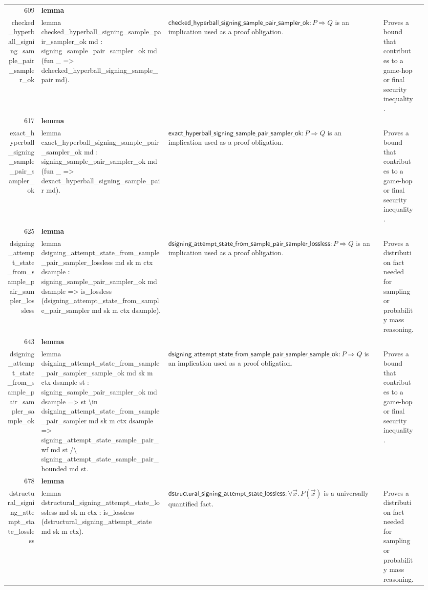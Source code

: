 \documentclass[10pt]{article}
\newcommand{\ec}[1]{\begingroup\ttfamily\scriptsize #1\endgroup}
\begin{document}
\begin{longtable}{r L{0.17\textwidth} L{0.26\textwidth} L{0.27\textwidth} L{0.20\textwidth}}
609 & \textbf{lemma}\\\ec{checked\_hyperball\_signing\_sample\_pair\_sampler\_ok} & \ec{lemma checked\_hyperball\_signing\_sample\_pair\_sampler\_ok md : signing\_sample\_pair\_sampler\_ok md (fun \_ => dchecked\_hyperball\_signing\_sample\_pair md).} & \(\mathsf{checked\_hyperball\_signing\_sample\_pair\_sampler\_ok} : P \Rightarrow Q\) is an implication used as a proof obligation. & Proves a bound that contributes to a game-hop or final security inequality. \\
617 & \textbf{lemma}\\\ec{exact\_hyperball\_signing\_sample\_pair\_sampler\_ok} & \ec{lemma exact\_hyperball\_signing\_sample\_pair\_sampler\_ok md : signing\_sample\_pair\_sampler\_ok md (fun \_ => dexact\_hyperball\_signing\_sample\_pair md).} & \(\mathsf{exact\_hyperball\_signing\_sample\_pair\_sampler\_ok} : P \Rightarrow Q\) is an implication used as a proof obligation. & Proves a bound that contributes to a game-hop or final security inequality. \\
625 & \textbf{lemma}\\\ec{dsigning\_attempt\_state\_from\_sample\_pair\_sampler\_lossless} & \ec{lemma dsigning\_attempt\_state\_from\_sample\_pair\_sampler\_lossless md sk m ctx dsample : signing\_sample\_pair\_sampler\_ok md dsample => is\_lossless (dsigning\_attempt\_state\_from\_sample\_pair\_sampler md sk m ctx dsample).} & \(\mathsf{dsigning\_attempt\_state\_from\_sample\_pair\_sampler\_lossless} : P \Rightarrow Q\) is an implication used as a proof obligation. & Proves a distribution fact needed for sampling or probability mass reasoning. \\
643 & \textbf{lemma}\\\ec{dsigning\_attempt\_state\_from\_sample\_pair\_sampler\_sample\_ok} & \ec{lemma dsigning\_attempt\_state\_from\_sample\_pair\_sampler\_sample\_ok md sk m ctx dsample st : signing\_sample\_pair\_sampler\_ok md dsample => st \textbackslash{}in dsigning\_attempt\_state\_from\_sample\_pair\_sampler md sk m ctx dsample => signing\_attempt\_state\_sample\_pair\_wf md st /\textbackslash{} signing\_attempt\_state\_sample\_pair\_bounded md st.} & \(\mathsf{dsigning\_attempt\_state\_from\_sample\_pair\_sampler\_sample\_ok} : P \Rightarrow Q\) is an implication used as a proof obligation. & Proves a bound that contributes to a game-hop or final security inequality. \\
678 & \textbf{lemma}\\\ec{dstructural\_signing\_attempt\_state\_lossless} & \ec{lemma dstructural\_signing\_attempt\_state\_lossless md sk m ctx : is\_lossless (dstructural\_signing\_attempt\_state md sk m ctx).} & \(\mathsf{dstructural\_signing\_attempt\_state\_lossless} : \forall \vec{x}.\, P(\vec{x})\) is a universally quantified fact. & Proves a distribution fact needed for sampling or probability mass reasoning. \\

\end{longtable}
\end{document}
